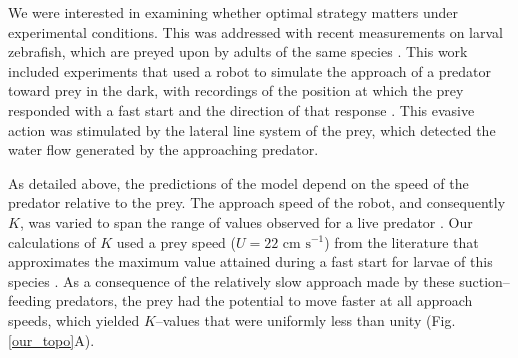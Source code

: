 \documentclass[12pt]{article}
\begin{document}
We were interested in examining whether optimal strategy matters under experimental conditions. This was addressed with recent  measurements on larval zebrafish, which are preyed upon by adults of the same species \citep{Stewart:2013bh}. 
This work included experiments that used a robot to simulate the approach of a predator toward prey in the dark, with recordings of the position at which the prey responded with a fast start and the direction of that response \citep{Stewart:2014cm}. 
This evasive action was stimulated by the lateral line system of the prey, which detected the water flow generated by the approaching predator. 

As detailed above, the predictions of the model depend on the speed of the predator relative to the prey. The approach speed of the robot, and consequently $K$, was varied to span the range of values observed for a live predator \citep{Stewart:2013bh}. 
Our calculations of $K$ used a prey speed ($U=22 \text{ cm s}^{-1}$) from the literature that approximates the maximum value attained during a fast start for larvae of this species \citep{Budick:2000wrb, Muller:2004hp}. 
As a consequence of the relatively slow approach made by these suction--feeding predators, the prey had the potential to move faster at all approach speeds, which yielded $K$--values that were uniformly less than unity (Fig. \ref{our_topo}A).
\end{document}
